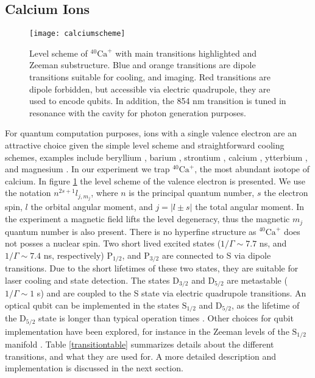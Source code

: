 \subsection{Calcium Ions}
\label{sec:calciumion}
\begin{figure}
\centering
\texttt{[image: calciumscheme]}
\caption{Level scheme of $^{40}\text{Ca}^+$ with main transitions highlighted and Zeeman substructure. Blue and orange transitions are dipole transitions suitable for cooling, and imaging. Red transitions are dipole forbidden, but accessible via electric quadrupole, they are used to encode qubits. In addition, the 854 nm transition is tuned in resonance with the cavity for photon generation purposes.}
\label{calciumscheme}
\end{figure}
For quantum computation purposes, ions with a single valence electron are an attractive choice given the simple level scheme and straightforward cooling schemes, examples include beryllium \cite{beryllium}, barium \cite{barium}, strontium \cite{strontium}, calcium \cite{calcium}, ytterbium \cite{PhysRevA.44.R20}, and magnesium \cite{magnesium}. In our experiment we trap $^{40}\text{Ca}^+$, the most abundant isotope of calcium. In figure \ref{calciumscheme} the level scheme of the valence electron is presented. We use the notation $n^{2s+1}l_{j,m_j}$, where $n$ is the principal quantum number, $s$ the electron spin, $l$ the orbital angular moment, and $j = |l\pm s|$ the total angular moment. In the experiment a magnetic field lifts the level degeneracy, thus the magnetic $m_j$ quantum number is also present. There is no hyperfine structure as $^{40}\text{Ca}^+$ does not posses a nuclear spin. Two short lived excited states ($1/\Gamma \sim 7.7$ ns, and $1/\Gamma \sim 7.4$ ns, respectively) $\text{P}_{1/2}$, and $\text{P}_{3/2}$ are connected to S via dipole transitions. Due to the short lifetimes of these two states, they are suitable for laser cooling and state detection.
 The states $\text{D}_{3/2}$ and $\text{D}_{5/2}$ are metastable ($ 1/\Gamma \sim 1$ s) and are coupled to the S state via electric quadrupole transitions. An optical qubit can be implemented in the states $\text{S}_{1/2}$ and $\text{D}_{5/2}$, as the lifetime of the $\text{D}_{5/2}$ state is longer than typical operation times \cite{calciumqubit}. Other choices for qubit implementation have been explored, for instance in the Zeeman levels of the $\text{S}_{1/2}$ manifold \cite{Ruster2016}. Table \ref{transitiontable} summarizes details about the different transitions, and what they are used for. A more detailed description and implementation is discussed in the next section.

